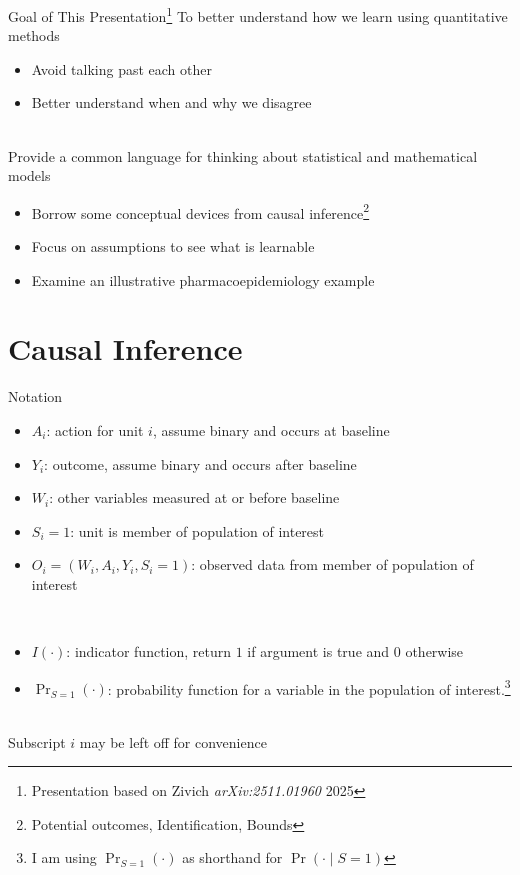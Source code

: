 \documentclass[aspectratio=169]{beamer}
\begin{document}
\begin{frame}{Goal of This Presentation\footnote[frame]{Presentation based on Zivich \textit{arXiv:2511.01960} 2025}}
	To better understand how we learn using quantitative methods
	\begin{itemize}
		\item Avoid talking past each other
		\item Better understand when and why we disagree
	\end{itemize}
	~\\
	Provide a common language for thinking about statistical and mathematical models
	\begin{itemize}
		\item Borrow some conceptual devices from causal inference\footnote[frame]{Potential outcomes, Identification, Bounds}
		\item Focus on assumptions to see what is learnable
		\item Examine an illustrative pharmacoepidemiology example
	\end{itemize}
\end{frame}

\section{Causal Inference}

\begin{frame}{Notation}
	\begin{itemize}
		\item[] $A_i$: action for unit $i$, assume binary and occurs at baseline
		\item[] $Y_i$: outcome, assume binary and occurs after baseline
		\item[] $W_i$: other variables measured at or before baseline
		\item[] $S_i=1$: unit is member of population of interest
		\item[] $O_i = (W_i, A_i, Y_i, S_i=1)$: observed data from member of population of interest
	\end{itemize}
	~\\
	\begin{itemize}
		\item[] $I(\cdot)$: indicator function, return $1$ if argument is true and $0$ otherwise
		\item[] $\Pr_{S=1}(\cdot)$: probability function for a variable in the population of interest.\footnote[frame]{I am using $\Pr_{S=1}(\cdot)$ as shorthand for $\Pr(\cdot \mid S=1)$}
	\end{itemize}
	~\\
	Subscript $i$ may be left off for convenience
\end{frame}
\end{document}

